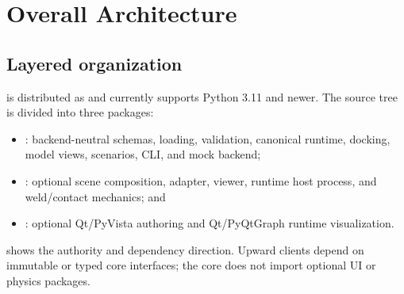 \section{Overall Architecture}
\label{sec:architecture}

\subsection{Layered organization}

\modsim{} is distributed as  and currently supports Python 3.11
and newer. The source tree is divided into three packages:

\begin{itemize}
  \item {}: backend-neutral schemas, loading, validation, canonical
        runtime, docking, model views, scenarios, CLI, and mock backend;
  \item {}: optional scene composition, adapter,
        viewer, runtime host process, and weld/contact mechanics; and
  \item {}: optional Qt/PyVista authoring and Qt/PyQtGraph
        runtime visualization.
\end{itemize}

 shows the authority and dependency direction. Upward clients depend
on immutable or typed core interfaces; the core does not import optional UI or physics
packages.

